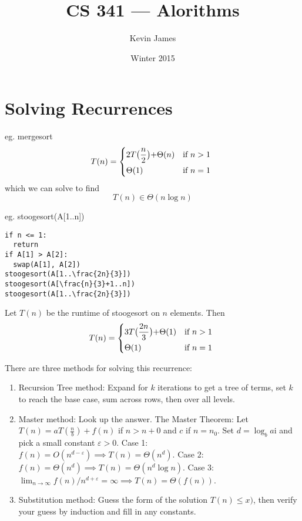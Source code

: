 \documentclass[12pt]{article}
\begin{document}
\title{CS 341 --- Alorithms}
\author{Kevin James}
\date{\vspace{-2ex}Winter 2015}
\maketitle\HRule

\tableofcontents
\newpage

\section{Solving Recurrences}
eg. mergesort
\[ T(n) =
\begin{dcases*}
2T\bigl(\frac{n}{2}\bigl) + \Theta(n) & if $n > 1$ \\
\Theta(1) & if $n = 1$
\end{dcases*}\]
which we can solve to find \[ T(n) \in \Theta(n\log n) \]

eg. stoogesort(A[1..n])
\begin{verbatim}
if n <= 1:
  return
if A[1] > A[2]:
  swap(A[1], A[2])
stoogesort(A[1..\frac{2n}{3}])
stoogesort(A[\frac{n}{3}+1..n])
stoogesort(A[1..\frac{2n}{3}])
\end{verbatim}

Let $T(n)$ be the runtime of stoogesort on $n$ elements. Then \[ T(n) =
\begin{dcases*}
3T\bigl(\frac{2n}{3}\bigl) + \Theta(1) & if $n > 1$ \\
\Theta(1) & if $n = 1$
\end{dcases*}\]

There are three methods for solving this recurrence:
\begin{enumerate}
\item Recursion Tree method: Expand for $k$ iterations to get a tree of terms, set $k$ to reach the base case, sum across rows, then over all levels.
\item Master method: Look up the answer. The Master Theorem: Let $T(n) = aT(\frac{n}{b}) + f(n)$ if $n > n+0$ and $c$ if $n = n_0$. Set $d = \log_b a$i and pick a small constant $\varepsilon > 0$. Case 1: $f(n) = O(n^{d-\varepsilon}) \implies T(n) = \Theta(n^d)$. Case 2: $f(n) = \Theta(n^d) \implies T(n) = \Theta(n^d \log n)$. Case 3: $\lim_{n\to\infty} f(n) / n^{d+\varepsilon} = \infty \implies T(n) = \Theta(f(n))$.
\item Substitution method: Guess the form of the solution $T(n) \leq x)$, then verify your guess by induction and fill in any constants.
\end{enumerate}
\end{document}
